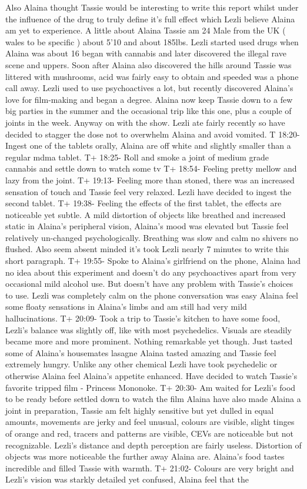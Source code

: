 \documentclass[12pt]{book}
\begin{document}
Also Alaina thought Tassie would be interesting to write this report whilst under the influence of the drug to truly define it's full effect which Lezli believe Alaina am yet to experience. A little about Alaina Tassie am 24 Male from the UK ( wales to be specific ) about 5'10 and about 185lbs. Lezli started used drugs when Alaina was about 16 began with cannabis and later discovered the illegal rave scene and uppers. Soon after Alaina also discovered the hills around Tassie was littered with mushrooms, acid was fairly easy to obtain and speeded was a phone call away. Lezli used to use psychoactives a lot, but recently discovered Alaina's love for film-making and began a degree. Alaina now keep Tassie down to a few big parties in the summer and the occasional trip like this one, plus a couple of joints in the week. Anyway on with the show. Lezli ate fairly recently so have decided to stagger the dose not to overwhelm Alaina and avoid vomited. T 18:20- Ingest one of the tablets orally, Alaina are off white and slightly smaller than a regular mdma tablet. T+ 18:25- Roll and smoke a joint of medium grade cannabis and settle down to watch some tv T+ 18:54- Feeling pretty mellow and lazy from the joint. T+ 19:13- Feeling more than stoned, there was an increased sensation of touch and Tassie feel very relaxed. Lezli have decided to ingest the second tablet. T+ 19:38- Feeling the effects of the first tablet, the effects are noticeable yet subtle. A mild distortion of objects like breathed and increased static in Alaina's peripheral vision, Alaina's mood was elevated but Tassie feel relatively un-changed psychologically. Breathing was slow and calm no shivers no flushed. Also seem absent minded it's took Lezli nearly 7 minutes to write this short paragraph. T+ 19:55- Spoke to Alaina's girlfriend on the phone, Alaina had no idea about this experiment and doesn't do any psychoactives apart from very occasional mild alcohol use. But doesn't have any problem with Tassie's choices to use. Lezli was completely calm on the phone conversation was easy Alaina feel some floaty sensations in Alaina's limbs and am still had very mild hallucinations. T+ 20:09- Took a trip to Tassie's kitchen to have some food, Lezli's balance was slightly off, like with most psychedelics. Visuals are steadily became more and more prominent. Nothing remarkable yet though. Just tasted some of Alaina's housemates lasagne Alaina tasted amazing and Tassie feel extremely hungry. Unlike any other chemical Lezli have took psychedelic or otherwise Alaina feel Alaina's appetite enhanced. Have decided to watch Tassie's favorite tripped film - Princess Mononoke. T+ 20:30- Am waited for Lezli's food to be ready before settled down to watch the film Alaina have also made Alaina a joint in preparation, Tassie am felt highly sensitive but yet dulled in equal amounts, movements are jerky and feel unusual, colours are visible, slight tinges of orange and red, tracers and patterns are visible, CEVs are noticeable but not recognizable. Lezli's distance and depth perception are fairly useless. Distortion of objects was more noticeable the further away Alaina are. Alaina's food tastes incredible and filled Tassie with warmth. T+ 21:02- Colours are very bright and Lezli's vision was starkly detailed yet confused, Alaina feel that the 
\end{document}
